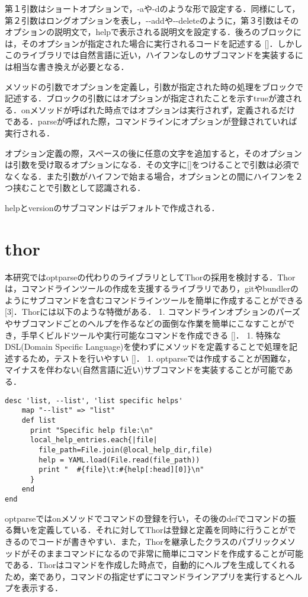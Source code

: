 第１引数はショートオプションで，-aや-dのような形で設定する．同様にして，第２引数はロングオプションを表し，-\/-addや-\/-deleteのように，第３引数はそのオプションの説明文で，helpで表示される説明文を設定する．後ろのブロックには，そのオプションが指定された場合に実行されるコードを記述する
{[}{]}．しかしこのライブラリでは自然言語に近い，ハイフンなしのサブコマンドを実装するには相当な書き換えが必要となる．

メソッドの引数でオプションを定義し，引数が指定された時の処理をブロックで記述する．ブロックの引数にはオプションが指定されたことを示すtrueが渡される．onメソッドが呼ばれた時点ではオプションは実行されず，定義されるだけである．parseが呼ばれた際，コマンドラインにオプションが登録されていれば実行される．

オプション定義の際，スペースの後に任意の文字を追加すると，そのオプションは引数を受け取るオプションになる．その文字に{[}{]}をつけることで引数は必須でなくなる．また引数がハイフンで始まる場合，オプションとの間にハイフンを２つ挟むことで引数として認識される．

helpとversionのサブコマンドはデフォルトで作成される．

\section{thor}\label{thor}

本研究ではoptparseの代わりのライブラリとしてThorの採用を検討する．Thorは，コマンドラインツールの作成を支援するライブラリであり，gitやbundlerのようにサブコマンドを含むコマンドラインツールを簡単に作成することができる
{[}3{]}．Thorには以下のような特徴がある． 1.
コマンドラインオプションのパーズやサブコマンドごとのヘルプを作るなどの面倒な作業を簡単にこなすことができ，手早くビルドツールや実行可能なコマンドを作成できる
{[}{]}． 1. 特殊なDSL(Domain Specific
Language)を使わずにメソッドを定義することで処理を記述するため，テストを行いやすい
{[}{]}． 1.
optparseでは作成することが困難な，マイナスを伴わない(自然言語に近い)サブコマンドを実装することが可能である．

\begin{verbatim}
desc 'list, --list', 'list specific helps'
    map "--list" => "list"
    def list
      print "Specific help file:\n"
      local_help_entries.each{|file|
        file_path=File.join(@local_help_dir,file)
        help = YAML.load(File.read(file_path))
        print "  #{file}\t:#{help[:head][0]}\n"
      }
    end
end
\end{verbatim}

optparseではonメソッドでコマンドの登録を行い，その後のdefでコマンドの振る舞いを定義している．それに対してThorは登録と定義を同時に行うことができるのでコードが書きやすい．また，Thorを継承したクラスのパブリックメソッドがそのままコマンドになるので非常に簡単にコマンドを作成することが可能である．Thorはコマンドを作成した時点で，自動的にヘルプを生成してくれるため，楽であり，コマンドの指定せずにコマンドラインアプリを実行するとヘルプを表示する．

